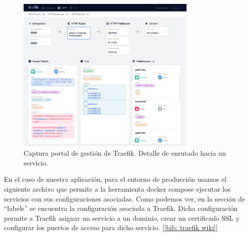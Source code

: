 \documentclass[a4paper, oneside, 12pt]{book}
\begin{document}
	\begin{figure}[h!]
		\begin{center}
			\includegraphics[width=0.78\textwidth]{img/traefik_example.png}
			\caption{Captura portal de gestión de Traefik. Detalle de enrutado hacia un servicio.}
		\end{center}
	\end{figure}
	
	\pagebreak
	
	\noindent En el caso de nuestra aplicación, para el entorno de producción usamos el siguiente archivo que permite a la herramienta docker compose ejecutar los servicios con sus configuraciones asociadas. Como podemos ver, en la sección de ``labels'' se encuentra la configuración asociada a Traefik. Dicha configuración permite a Traefik asignar un servicio a un dominio, crear un certificado SSL y configurar los puertos de acceso para dicho servicio. [\ref{bib: traefik wiki}]
	
\end{document}

